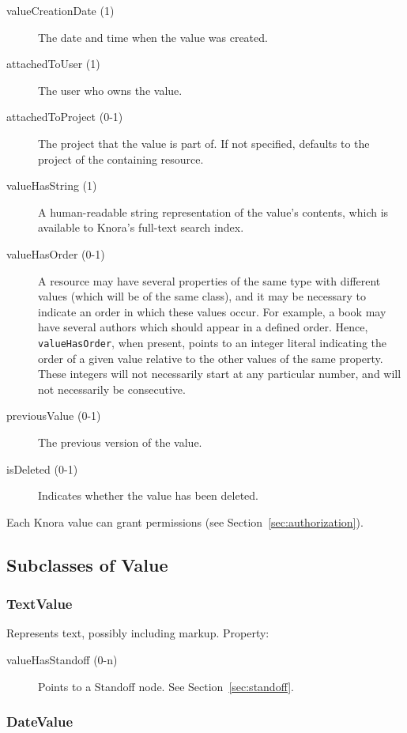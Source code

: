 \documentclass[12pt, a4paper]{article}
\begin{document}
\begin{description}
  \item[valueCreationDate (1)] The date and time when the value was created.
  \item[attachedToUser (1)] The user who owns the value.
  \item[attachedToProject (0-1)] The project that the value is part of. If not specified, defaults to the project of the containing resource.
  \item[valueHasString (1)] A human-readable string representation of the value's contents, which is available to Knora's full-text search index.
  \item[valueHasOrder (0-1)] A resource may have several properties of the same type with different values (which will be of the same class), and it may be necessary to indicate an order in which these values occur. For example, a book may have several authors which should appear in a defined order. Hence, \texttt{valueHasOrder}, when present, points to an integer literal indicating the order of a given value relative to the other values of the same property. These integers will not necessarily start at any particular number, and will not necessarily be consecutive.
  \item[previousValue (0-1)] The previous version of the value.
  \item[isDeleted (0-1)] Indicates whether the value has been deleted.
\end{description}

Each Knora value can grant permissions (see Section~\ref{sec:authorization}).

\subsection{Subclasses of Value}

\subsubsection{TextValue}

Represents text, possibly including markup. Property:

\begin{description}
	\item[valueHasStandoff (0-n)] Points to a Standoff node. See Section~\ref{sec:standoff}.
\end{description}

\subsubsection{DateValue}
\end{document}
